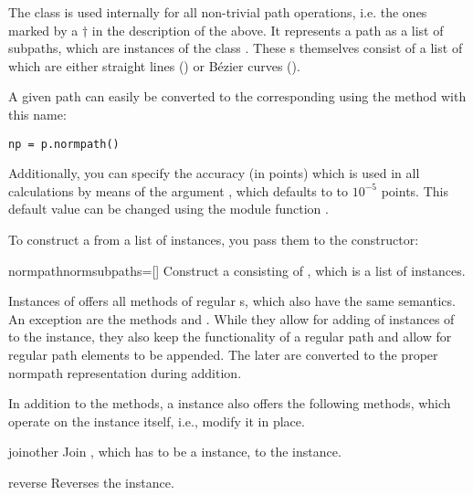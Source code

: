 \label{path:normpath}

The  class is used internally for all non-trivial path
operations, i.e. the ones marked by a $\dagger$ in the description of
the  above. It represents a path as a list of subpaths, which are
instances of the class . These s
themselves consist of a list of  which are
either straight lines () or B\'ezier curves
().

A given path can easily be converted to the corresponding 
using the method with this name:
\begin{verbatim}
np = p.normpath()
\end{verbatim}
Additionally, you can specify the accuracy (in points) which is used
in all  calculations by means of the argument
, which defaults to to $10^{-5}$ points. This default
value can be changed using the module function .

To construct a  from a list of 
instances, you pass them to the  constructor:

\begin{classdesc}{normpath}{normsubpaths=[]}
  Construct a  consisting of , which
  is a list of  instances.
\end{classdesc}

Instances of  offers all methods of regular
s, which also have the same semantics. An exception are
the methods  and . While they allow for
adding of instances of  to the 
instance, they also keep the functionality of a regular path and allow
for regular path elements to be appended. The later are converted to
the proper normpath representation during addition.

In addition to the  methods, a  instance
also offers the following methods, which operate on the instance
itself, i.e., modify it in place.

\begin{methoddesc}{join}{other}
  Join , which has to be a  instance, to
  the  instance.
\end{methoddesc}

\begin{methoddesc}{reverse}{}
  Reverses the  instance.
\end{methoddesc}


